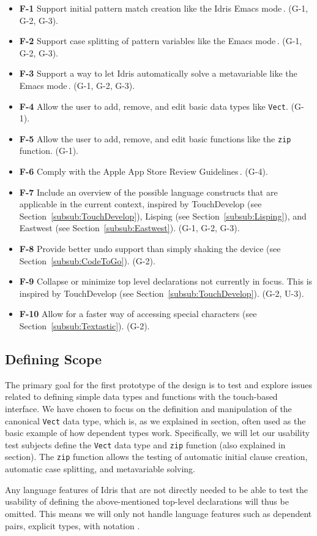 \begin{itemize}
	\item \textbf{F-1} Support initial pattern match creation like the Idris Emacs mode\,\cite{Idris:EmacsMode}. (G-1, G-2, G-3).
	\item \textbf{F-2} Support case splitting of pattern variables like the Emacs mode\,\cite{Idris:EmacsMode}. (G-1, G-2, G-3).
	\item \textbf{F-3} Support a way to let Idris automatically solve a metavariable like the Emacs mode\,\cite{Idris:EmacsMode}. (G-1, G-2, G-3).
	\item \textbf{F-4} Allow the user to add, remove, and edit basic data types like \texttt{Vect}. (G-1).
	\item \textbf{F-5} Allow the user to add, remove, and edit basic functions like the \texttt{zip} function. (G-1).
	\item \textbf{F-6} Comply with the Apple App Store Review Guidelines\,\cite{AppStoreGuidelines}. (G-4).
	\item \textbf{F-7} Include an overview of the possible language constructs that are	applicable in the current context, inspired by TouchDevelop (see Section~\ref{subsub:TouchDevelop}), Lisping (see Section~\ref{subsub:Lisping}), and Eastwest (see Section~\ref{subsub:Eastwest}). (G-1, G-2, G-3).
	\item \textbf{F-8} Provide better undo support than simply shaking the device (see Section~\ref{subsub:CodeToGo}). (G-2).
	\item \textbf{F-9} Collapse or minimize top level declarations not currently in focus. This is inspired by TouchDevelop	(see Section~\ref{subsub:TouchDevelop}). (G-2, U-3).
	\item \textbf{F-10} Allow for a faster way of accessing special characters (see Section~\ref{subsub:Textastic}). (G-2).
\end{itemize}

\subsection{Defining Scope} 
The primary goal for the first prototype of the design is to test and explore
issues related to defining simple data types and functions with the touch-based interface. 
We have chosen to focus on the definition and manipulation of the canonical \texttt{Vect} data type, which is, as we explained in section, often used as the basic example of how dependent types work.
Specifically, we will let our usability test subjects define the \texttt{Vect} data type and \texttt{zip} function (also explained in section).
The \texttt{zip} function allows the testing of automatic initial clause creation, automatic case splitting, and metavariable solving.

Any language features of Idris that are not directly needed to be able to test the usability of defining the above-mentioned top-level declarations will thus be omitted. This means we will only not handle language features such as dependent pairs, explicit types, with notation .
